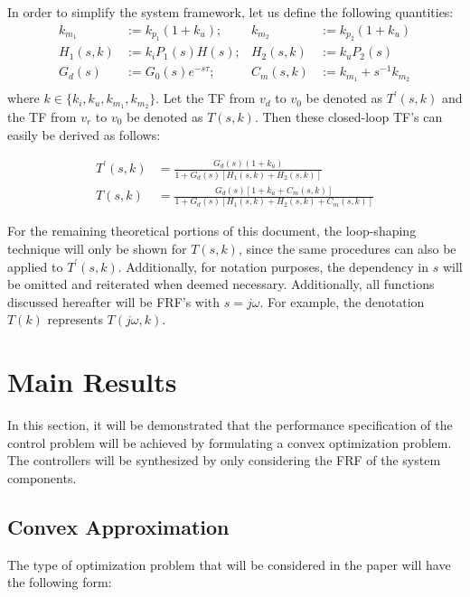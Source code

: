 \documentclass[a4paper, 10pt, conference]{ieeeconf}
\begin{document}
In order to simplify the system framework, let us define the following quantities:
\begin{equation} \label{eq:new_var}
\begin{aligned}
k_{m_1} &:= k_{p_1}(1+k_u) ;  &k_{m_2} &:= k_{p_2}(1+k_u)  \\
H_1(s,k) &:= k_iP_1(s)H(s);  &H_2(s,k) &:= k_uP_2(s) \\
G_d(s) &:= G_0(s)e^{-s\tau}; &C_m(s,k) &:= k_{m_1}+s^{-1}k_{m_2}\\ 
\end{aligned}
\end{equation}
where $k \in \{k_i,k_u,k_{m_1},k_{m_2}\}$. Let the TF from $v_d$ to $v_0$ be denoted as $T^{\prime}(s,k)$ and the TF from $v_r$ to $v_0$ be denoted as $T(s,k)$.  Then these closed-loop TF's can easily be derived as follows:

\begin{align}
T^{\prime}(s,k) &= \frac{G_d(s)(1+k_u)}{1+G_d(s)[H_1(s,k)+H_2(s,k)]} \label{eq:Tclp}  \\ 
T(s,k) &= \frac{G_d(s)[1+k_u+C_m(s,k)]}{1+G_d(s)[H_1(s,k)+H_2(s,k)+C_m(s,k)]}  \label{eq:Tcl} 
\end{align}

For the remaining theoretical portions of this document, the loop-shaping technique will only be shown for $T(s,k)$, since the same procedures can also be applied to $T^{\prime}(s,k)$. Additionally, for notation purposes, the dependency in $s$ will be omitted and reiterated when deemed necessary. Additionally, all functions discussed hereafter will be FRF's with $s = j\omega$. For example, the denotation $T(k)$ represents $T(j\omega,k)$.



\section{Main Results}
\label{sec:main}
In this section, it will be demonstrated that the performance specification of the control problem will be achieved by formulating a convex optimization problem. The controllers will be synthesized by only considering the FRF of the system components.

\subsection{Convex Approximation}
The type of optimization problem that will be considered in the paper will have the following form:
\end{document}
